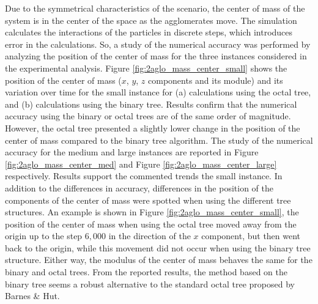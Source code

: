\documentclass[runningheads]{llncs}
\begin{document}
Due to the symmetrical characteristics of the scenario, the center of mass of the system is in the center of the space as the agglomerates move. The simulation calculates the interactions of the particles in discrete steps, which introduces error in the calculations. So, a study of the numerical accuracy was performed by analyzing the position of the center of mass for the three instances considered in the experimental analysis. Figure \ref{fig:2aglo_mass_center_small} shows the position of the center of mass ($x$, $y$, $z$ components and its module) and its variation over time for the small instance 
for (a) calculations
using the octal tree, 
and
(b) calculations
using the binary tree.
Results confirm that the numerical accuracy using the binary or octal trees are of the same order of magnitude. However, the octal tree presented a slightly lower change in the position of the center of mass compared to the binary tree algorithm. The study of the numerical accuracy for the medium and large instances are reported in Figure \ref{fig:2aglo_mass_center_med} and Figure \ref{fig:2aglo_mass_center_large} respectively. Results  support the commented trends the small instance. In addition to the differences in accuracy, differences in the position of the components of the center of mass were spotted when using the different tree structures. An example is shown in Figure \ref{fig:2aglo_mass_center_small}, the position of the center of mass when using the octal tree moved away from the origin up to the step $6,000$ in the direction of the $x$ component, but then went back to the origin, while this movement did not occur when using the binary tree structure. Either way, the modulus of the center of mass behaves the same for the binary and octal trees.  
From the reported results, the method based on the binary tree seems a robust alternative to the standard octal tree proposed by Barnes \& Hut.
\end{document}
